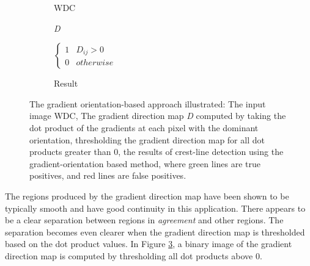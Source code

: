 \begin{figure}
	\centering
	\begin{subfigure}{0.48\textwidth}
		\centering
		\caption{WDC}
		\label{fig:orientation_based_wdc}
	\end{subfigure}
	\begin{subfigure}{0.48\textwidth}
		\centering
		\caption{\emph{D}}
		\label{fig:orientation_based_dot_product}
	\end{subfigure}
	\begin{subfigure}{0.48\textwidth}
		\centering
		\caption{$\begin{cases}
				1 & D_{ij} > 0\\
				0 & otherwise
			\end{cases}$}
		\label{fig:orientation_based_threshold_dot_product}
	\end{subfigure}
	\begin{subfigure}{0.48\textwidth}
		\centering
		\caption{Result}
		\label{fig:orientation_based_results}
	\end{subfigure}
	\caption{The gradient orientation-based approach illustrated:  The input image WDC,  The gradient direction map \emph{D} computed by taking the dot product of the gradients at each pixel with the dominant orientation,  thresholding the gradient direction map for all dot products greater than 0,  the results of crest-line detection using the gradient-orientation based method, where green lines are true positives, and red lines are false positives. }
	\label{fig:orientation_based_process}
\end{figure}

The regions produced by the gradient direction map have been shown to be typically smooth and have good continuity in this application. There appears to be a clear separation between regions in \emph{agreement} and other regions. The separation becomes even clearer when the gradient direction map is thresholded based on the dot product values. In Figure \ref{fig:orientation_based_threshold_dot_product}, a binary image of the gradient direction map is computed by thresholding all dot products above 0.

